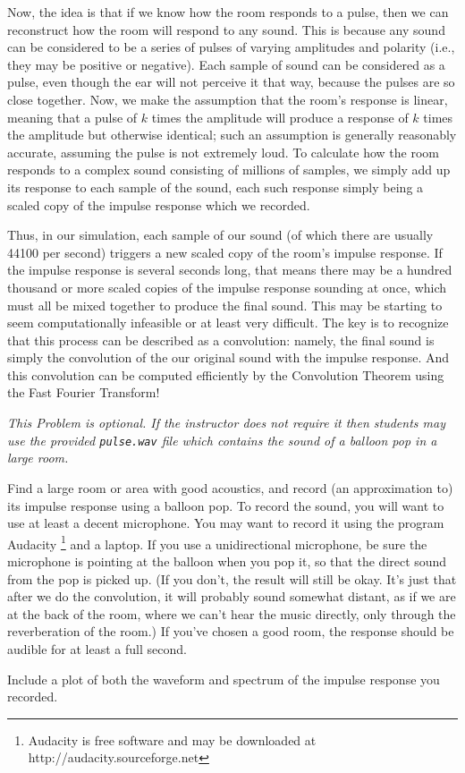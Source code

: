 Now, the idea is that if we know how the room responds to a pulse, then we can reconstruct how the room will respond to any sound. This is because any sound can be considered to be a series of pulses of varying amplitudes and polarity (i.e., they may be positive or negative). Each sample of sound can be considered as a pulse, even though the ear will not perceive it that way, because the pulses are so close together. Now, we make the assumption that the room's response is linear, meaning that a pulse of $k$ times the amplitude will produce a response of $k$ times the amplitude but otherwise identical; such an assumption is generally reasonably accurate, assuming the pulse is not extremely loud. To calculate how the room responds to a complex sound consisting of millions of samples, we simply add up its response to each sample of the sound, each such response simply being a scaled copy of the impulse response which we recorded.

Thus, in our simulation, each sample of our sound (of which there are usually 44100 per second) triggers a new scaled copy of the room's impulse response. If the impulse response is several seconds long, that means there may be a hundred thousand or more scaled copies of the impulse response sounding at once, which must all be mixed together to produce the final sound. This may be starting to seem computationally infeasible or at least very difficult. The key is to recognize that this process can be described as a convolution: namely, the final sound is simply the convolution of the our original sound with the impulse response. And this convolution can be computed efficiently by the Convolution Theorem using the Fast Fourier Transform!

\begin{problem}
\emph{This Problem is optional.  If the instructor does not require it then students may use the provided \texttt{pulse.wav} file which contains the sound of a balloon pop in a large room.}

Find a large room or area with good acoustics, and record (an approximation to) its impulse response using a balloon pop. To record the sound, you will want to use at least a decent microphone. You may want to record it using the program Audacity \footnote{Audacity is free software and may be downloaded at http://audacity.sourceforge.net} and a laptop. If you use a unidirectional microphone, be sure the microphone is pointing at the balloon when you pop it, so that the direct sound from the pop is picked up. (If you don't, the result will still be okay. It's just that after we do the convolution, it will probably sound somewhat distant, as if we are at the back of the room, where we can't hear the music directly, only through the reverberation of the room.)
If you've chosen a good room, the response should be audible for at least a full second.

Include a plot of both the waveform and spectrum of the impulse response you recorded.
\end{problem}

